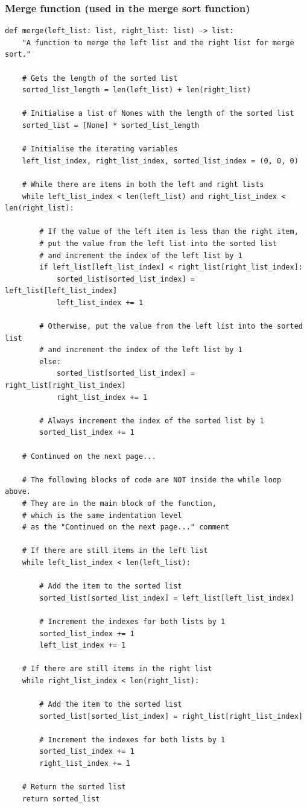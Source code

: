 \documentclass[11pt]{article}
\begin{document}
\subsubsection{Merge function (used in the merge sort function)}
\label{sec:org41003a1}
\begin{verbatim}
def merge(left_list: list, right_list: list) -> list:
    "A function to merge the left list and the right list for merge sort."

    # Gets the length of the sorted list
    sorted_list_length = len(left_list) + len(right_list)

    # Initialise a list of Nones with the length of the sorted list
    sorted_list = [None] * sorted_list_length

    # Initialise the iterating variables
    left_list_index, right_list_index, sorted_list_index = (0, 0, 0)

    # While there are items in both the left and right lists
    while left_list_index < len(left_list) and right_list_index < len(right_list):

        # If the value of the left item is less than the right item,
        # put the value from the left list into the sorted list
        # and increment the index of the left list by 1
        if left_list[left_list_index] < right_list[right_list_index]:
            sorted_list[sorted_list_index] = left_list[left_list_index]
            left_list_index += 1

        # Otherwise, put the value from the left list into the sorted list
        # and increment the index of the left list by 1
        else:
            sorted_list[sorted_list_index] = right_list[right_list_index]
            right_list_index += 1

        # Always increment the index of the sorted list by 1
        sorted_list_index += 1

    # Continued on the next page...

    # The following blocks of code are NOT inside the while loop above.
    # They are in the main block of the function,
    # which is the same indentation level
    # as the "Continued on the next page..." comment

    # If there are still items in the left list
    while left_list_index < len(left_list):

        # Add the item to the sorted list
        sorted_list[sorted_list_index] = left_list[left_list_index]

        # Increment the indexes for both lists by 1
        sorted_list_index += 1
        left_list_index += 1

    # If there are still items in the right list
    while right_list_index < len(right_list):

        # Add the item to the sorted list
        sorted_list[sorted_list_index] = right_list[right_list_index]

        # Increment the indexes for both lists by 1
        sorted_list_index += 1
        right_list_index += 1

    # Return the sorted list
    return sorted_list
\end{verbatim}
\end{document}
